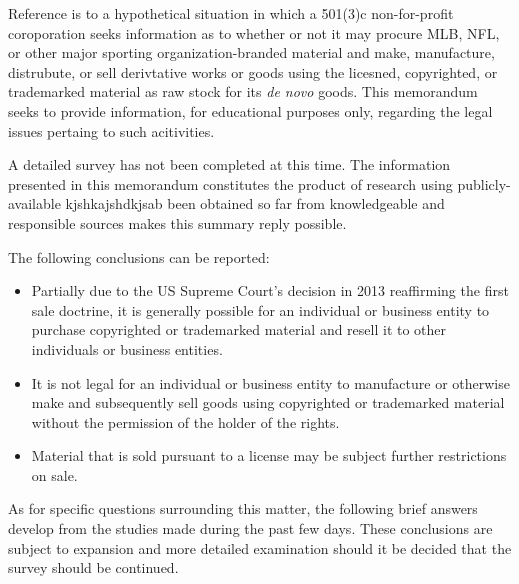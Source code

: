 \documentclass[letterpaper,11pt]{texMemo}
\begin{document}
\maketitle

Reference is to a hypothetical situation in which a 501(3)c non-for-profit coroporation seeks information as to whether or not it may procure MLB, NFL, or other major sporting organization-branded material and make, manufacture, distrubute, or sell derivtative works or goods using the licesned, copyrighted, or trademarked material as raw stock for its \emph{de novo} goods. This memorandum seeks to provide information, for educational purposes only, regarding the legal issues pertaing to such acitivities.

A detailed survey has not been completed at this time.  The information presented in this memorandum constitutes the product of research using publicly-available kjshkajshdkjsab been obtained so far from knowledgeable and responsible sources makes this summary reply possible.

The following conclusions can be reported:

\begin{itemize}
 \item Partially due to the US Supreme Court's decision in 2013 reaffirming the first sale doctrine, it is generally possible for an individual or business entity to purchase copyrighted or trademarked material and resell it to other individuals or business entities.
 \item It is not legal for an individual or business entity to manufacture or otherwise make and subsequently sell goods using copyrighted or trademarked material without the permission of the holder of the rights.
 \item Material that is sold pursuant to a license may be subject further restrictions on sale.

\end{itemize}

As for specific questions surrounding this matter, the following brief answers develop from the studies made during the past few days.  These conclusions are subject to expansion and more detailed examination should it be decided that the survey should be continued.
\end{document}

